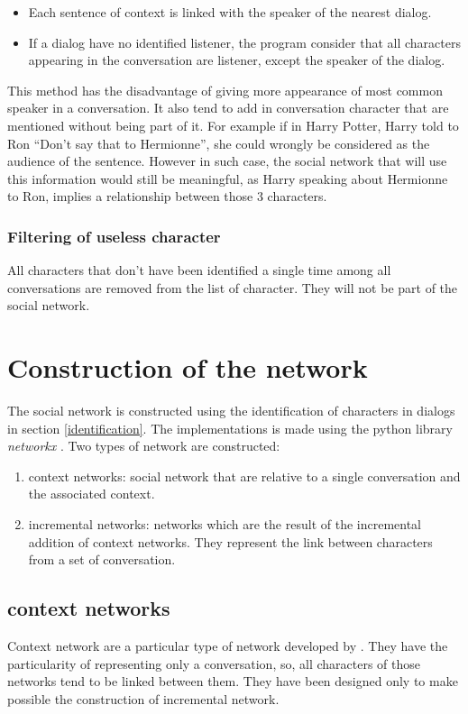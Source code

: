 \documentclass[a4paper, 12pt]{report}
\begin{document}
\begin{itemize}
\item Each sentence of context is linked with the speaker of the nearest dialog.

\item If a dialog have no identified listener, the program consider that all characters appearing in the conversation are listener, except the speaker of the dialog.
\end{itemize}
This method has the disadvantage of giving more appearance of most common speaker in a conversation. It also tend to add in conversation character that are mentioned without being part of it. For example if in Harry Potter, Harry told to Ron ``Don't say that to Hermionne'', she could wrongly be considered as the audience of the sentence. However in such case, the social network that will use this information would still be meaningful, as Harry speaking about Hermionne to Ron, implies a relationship between those 3 characters.


\subsubsection{Filtering of useless character}
All characters that don't have been identified a single time among all conversations are removed from the list of character. They will not be part of the social network.




\section{Construction of the network}
The social network is constructed using the identification of characters in dialogs in section \ref{identification}. The implementations is made using the python library \textit{networkx} \citep{networkx}.
Two types of network are constructed:
\begin{enumerate}
\item context networks: social network that are relative to a single conversation and the associated context. 
\item incremental networks: networks which are the result of the incremental addition of context networks. They represent the link between characters from a set of conversation.
\end{enumerate}
\subsection{context networks}
Context network are a particular type of network developed by \cite{original}. They have the particularity of representing only a conversation, so, all characters of those networks tend to be linked between them. They have been designed only to make possible the construction of incremental network. \\
\end{document}
